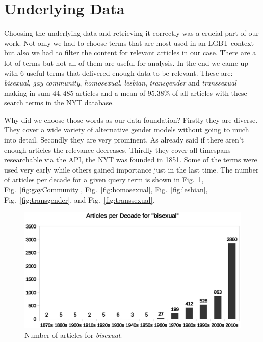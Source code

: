 \documentclass[10pt,a4paper,twocolumn]{scrartcl}
\begin{document}
\section{Underlying Data}\label{sec:underlyingdata}

Choosing the underlying data and retrieving it correctly was a crucial part of our work. Not only we had to choose terms that are most used in an LGBT context but also we had to filter the content for relevant articles in our case. There are a lot of terms but not all of them are useful for analysis. In the end we came up with 6 useful terms that delivered enough data to be relevant. These are: \textit{bisexual}, \textit{gay community}, \textit{homosexual}, \textit{lesbian}, \textit{transgender} and \textit{transsexual} making in sum $44,485$ articles and a mean of $95.38\%$ of all articles with these search terms in the NYT database. 

Why did we choose those words as our data foundation? Firstly they are diverse. They cover a wide variety of alternative gender models without going to much into detail. Secondly they are very prominent. As already said if there aren't enough articles the relevance decreases. Thirdly they cover all timespans researchable via the API, the NYT was founded in 1851. Some of the terms were used very early while others gained importance just in the last time. The number of articles per decade for a given query term is shown in Fig.~\ref{fig:bisexual}, Fig.~\ref{fig:gayCommunity}, Fig.~\ref{fig:homosexual}, Fig.~\ref{fig:lesbian}, Fig.~\ref{fig:transgender}, and Fig.~\ref{fig:transsexual}.


\begin{figure}
\includegraphics[width=\columnwidth]{figures/bisexual_decade}
\caption{Number of articles for \textit{bisexual}.} \label{fig:bisexual}
\end{figure}
\end{document}
